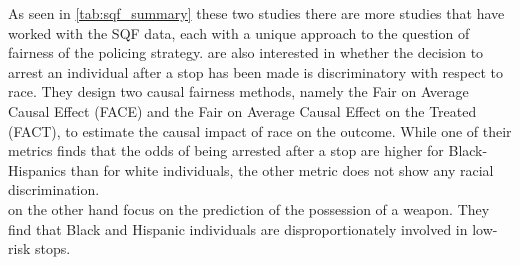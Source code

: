 As seen in \autoref{tab:sqf_summary} these two studies there are more studies that have worked with the SQF data, each with a unique approach to the question of fairness of the policing strategy. \cite{Khademi2019FADMELC} are also interested in whether the decision to arrest an individual after a stop has been made is discriminatory with respect to race. They design two causal fairness methods, namely the Fair on Average Causal Effect (FACE) and the Fair on Average Causal Effect on the Treated (FACT), to estimate the causal impact of race on the outcome. While one of their metrics finds that the odds of being arrested after a stop are higher for Black-Hispanics than for white individuals, the other metric does not show any racial discrimination.\\
\cite{goel2016} on the other hand focus on the prediction of the possession of a weapon. They find that Black and Hispanic individuals are disproportionately involved in low-risk stops.







